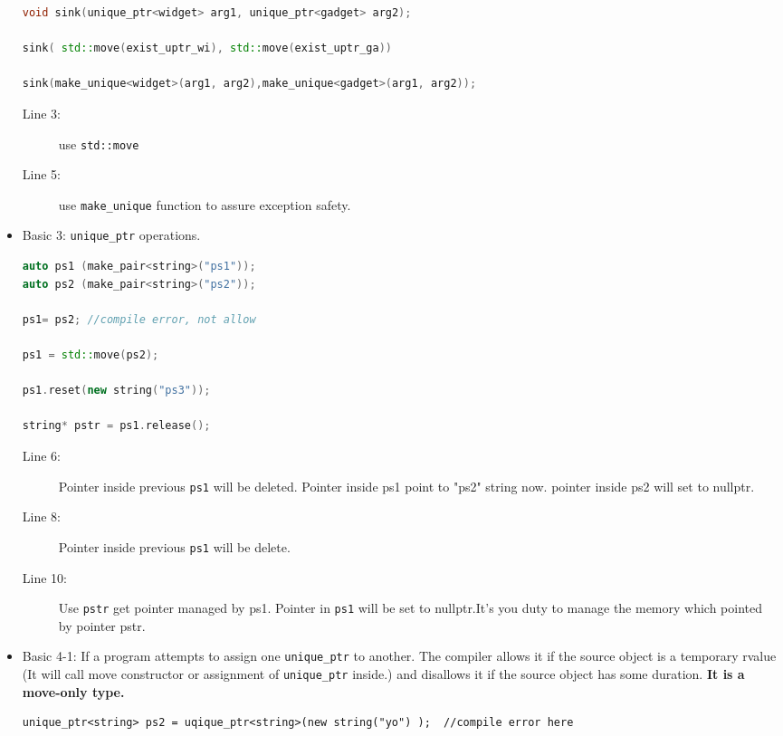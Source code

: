 \documentclass[a4paper,11pt,twoside]{book}
\begin{document}
\begin{itemize}
\begin{lstlisting}[frame=single, language=c++]
void sink(unique_ptr<widget> arg1, unique_ptr<gadget> arg2);

sink( std::move(exist_uptr_wi), std::move(exist_uptr_ga))

sink(make_unique<widget>(arg1, arg2),make_unique<gadget>(arg1, arg2));  
\end{lstlisting}
\begin{description} 
	\item[Line 3:] use \texttt{std::move}
	\item[Line 5:] use \texttt{make\_unique} function to assure exception safety.
\end{description}


\item Basic 3: \texttt{unique\_ptr} operations.
\begin{lstlisting}[frame=single, language=c++]
auto ps1 (make_pair<string>("ps1"));
auto ps2 (make_pair<string>("ps2"));

ps1= ps2; //compile error, not allow

ps1 = std::move(ps2);

ps1.reset(new string("ps3"));

string* pstr = ps1.release();
\end{lstlisting}
\begin{description}
	\item[Line 6:]  Pointer inside previous \texttt{ps1} will be deleted. Pointer inside ps1 point to "ps2" string now. pointer inside ps2 will set to nullptr.
	\item[Line 8:]  Pointer inside previous \texttt{ps1} will be delete.
	
	\item[Line 10:] Use \texttt{pstr} get pointer managed by ps1. Pointer in \texttt{ps1} will be set to nullptr.It's you duty to manage the memory which pointed by pointer pstr.
\end{description} 

\item Basic 4-1: If a program attempts to assign one \texttt{unique\_ptr} to another. The compiler allows it if the source object is a temporary rvalue (It will call move constructor or assignment of \texttt{unique\_ptr} inside.) and disallows it if the source object has some duration. \textbf{It is a move-only type.}
\begin{lstlisting}[numbers=none]
unique_ptr<string> ps2 = uqique_ptr<string>(new string("yo") );  //compile error here


\end{lstlisting}
\end{itemize}
\end{document}
